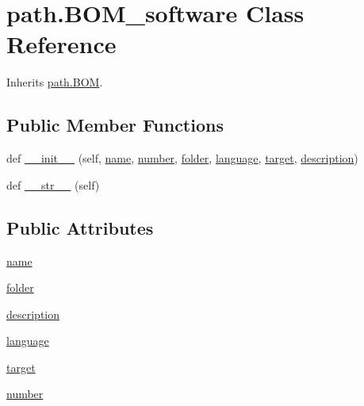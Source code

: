 \hypertarget{classpath_1_1_b_o_m__software}{}\section{path.\+B\+O\+M\+\_\+software Class Reference}
\label{classpath_1_1_b_o_m__software}


Inherits \hyperlink{classpath_1_1_b_o_m}{path.\+B\+O\+M}.

\subsection*{Public Member Functions}
\begin{DoxyCompactItemize}
\item 
def \hyperlink{classpath_1_1_b_o_m__software_a3c04b7be79e6ccc7fcafdf0c53bcfcf6}{\+\_\+\+\_\+init\+\_\+\+\_\+} (self, \hyperlink{classpath_1_1_b_o_m__software_ac4bad76a279a0984ce98f7c92970a513}{name}, \hyperlink{classpath_1_1_b_o_m__software_a9716f51d01e6c3c6cab342fb4921817f}{number}, \hyperlink{classpath_1_1_b_o_m__software_ac150f5e7720d6180d04fa12a99d77dd4}{folder}, \hyperlink{classpath_1_1_b_o_m__software_a2c86da364dc9b4ba49b6f9310fcd0be7}{language}, \hyperlink{classpath_1_1_b_o_m__software_af956fffaab53d93dc8246b4670347445}{target}, \hyperlink{classpath_1_1_b_o_m__software_a7703e0ee71e4d121b33f444f8c5de746}{description})
\item 
def \hyperlink{classpath_1_1_b_o_m__software_a92e19063085057026a7569de1f09c693}{\+\_\+\+\_\+str\+\_\+\+\_\+} (self)
\end{DoxyCompactItemize}
\subsection*{Public Attributes}
\begin{DoxyCompactItemize}
\item 
\hyperlink{classpath_1_1_b_o_m__software_ac4bad76a279a0984ce98f7c92970a513}{name}
\item 
\hyperlink{classpath_1_1_b_o_m__software_ac150f5e7720d6180d04fa12a99d77dd4}{folder}
\item 
\hyperlink{classpath_1_1_b_o_m__software_a7703e0ee71e4d121b33f444f8c5de746}{description}
\item 
\hyperlink{classpath_1_1_b_o_m__software_a2c86da364dc9b4ba49b6f9310fcd0be7}{language}
\item 
\hyperlink{classpath_1_1_b_o_m__software_af956fffaab53d93dc8246b4670347445}{target}
\item 
\hyperlink{classpath_1_1_b_o_m__software_a9716f51d01e6c3c6cab342fb4921817f}{number}
\end{DoxyCompactItemize}


